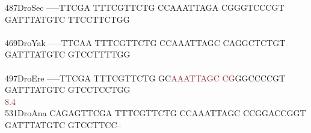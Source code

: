 \documentclass[11pt,twoside,reqno,a4paper]{article}
\begin{document}
{487\hspace*{1\charwidth}DroSec	-----TTCGA	TTTCGTTCTG	CCAAATTAGA	CGGGTCCCGT	GATTTATGTC	TTCCTTCTGG	\\
\hspace*{4\charwidth}\hspace*{7\charwidth}\hspace*{1\charwidth}\hspace*{1\charwidth}\hspace*{1\charwidth}\hspace*{1\charwidth}\hspace*{1\charwidth}\hspace*{1\charwidth}\\
469\hspace*{1\charwidth}DroYak	-----TTCAA	TTTCGTTCTG	CCAAATTAGC	CAGGCTCTGT	GATTTATGTC	GTCCTTTTGG	\\
\hspace*{4\charwidth}\hspace*{7\charwidth}\hspace*{1\charwidth}\hspace*{1\charwidth}\hspace*{1\charwidth}\hspace*{1\charwidth}\hspace*{1\charwidth}\hspace*{1\charwidth}\\
497\hspace*{1\charwidth}DroEre	-----TTCGA	TTTCGTTCTG	GC\textcolor{Brown}{A}\textcolor{Brown}{A}\textcolor{Brown}{A}\textcolor{Brown}{T}\textcolor{Brown}{T}\textcolor{Brown}{A}\textcolor{Brown}{G}\textcolor{Brown}{C}	\textcolor{Brown}{C}\textcolor{Brown}{G}GGCCCCGT	GATTTATGTC	GTCCTCCTGG	\\
\hspace*{4\charwidth}\hspace*{7\charwidth}\hspace*{1\charwidth}\hspace*{1\charwidth}\hspace*{22\charwidth}\textcolor{Brown}{8.4}\hspace*{1\charwidth}\hspace*{1\charwidth}\hspace*{1\charwidth}\hspace*{1\charwidth}\\
531\hspace*{1\charwidth}DroAna	CAGAGTTCGA	TTTCGTTCTG	CCAAATTAGC	CCGGACCGGT	GATTTATGTC	GTCCTTCC--	\\
\hspace*{4\charwidth}\hspace*{7\charwidth}\hspace*{1\charwidth}\hspace*{1\charwidth}\hspace*{1\charwidth}\hspace*{1\charwidth}\hspace*{1\charwidth}\hspace*{1\charwidth}\\
}
\end{document}
